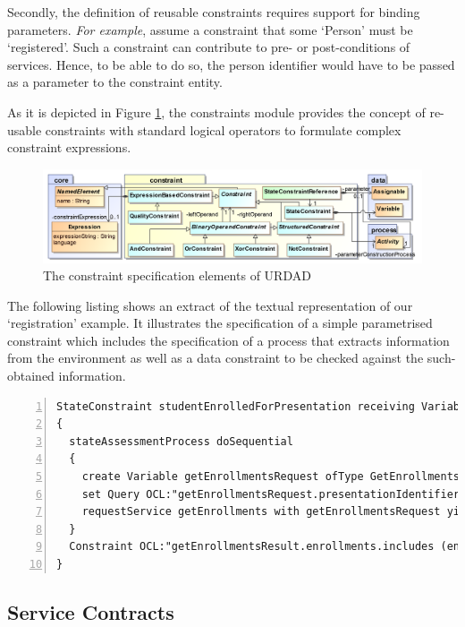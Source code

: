 Secondly, the definition of reusable constraints requires support for binding parameters. \emph{For example}, assume a constraint that some `Person' must be `registered'. Such a constraint can contribute to pre- or post-conditions of services. Hence, to be able to do so, the person identifier would have to be passed as a parameter to the constraint entity.

As it is depicted in Figure \ref{fig:constraintModule}, the constraints module provides the concept of re-usable constraints with standard logical operators to formulate complex constraint expressions.
\begin{figure}[Htbp]
  \centering
  \includegraphics{constraint}
  \caption{The constraint specification elements of URDAD}
  \label{fig:constraintModule}
\end{figure}

The following listing shows an extract of the textual representation of our `registration' example. It illustrates the specification of a simple parametrised constraint which includes the specification of a process that extracts information from the environment as well as a data constraint to be checked against the such-obtained information.
\lstset{language=urdad,caption=Specifying a state constraint in the textual URDAD DSL syntax.,label=constraintTextSyntax}
\small \begin{lstlisting}[numbers=left,escapechar=|]
StateConstraint studentEnrolledForPresentation receiving Variable enrollForPresentationRequest ofType EnrollForPresentationRequest
{
  stateAssessmentProcess doSequential
  {
    create Variable getEnrollmentsRequest ofType GetEnrollmentsRequest
    set Query OCL:"getEnrollmentsRequest.presentationIdentifier" equalTo Query OCL:"enrollForPresentationRequest.presentationIdentifier"
    requestService getEnrollments with getEnrollmentsRequest yielding Variable getEnrollmentsResult ofType GetEnrollmentsResult
  }
  Constraint OCL:"getEnrollmentsResult.enrollments.includes (enrollForPresentationRequest.personIdentifier)"
}
\end{lstlisting}\normalsize


\subsection{Service Contracts}

